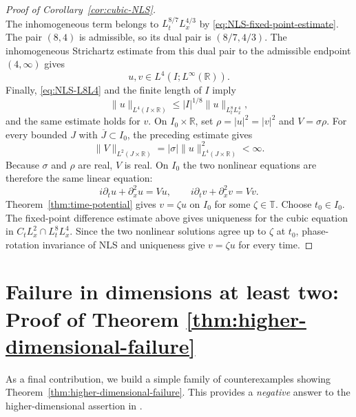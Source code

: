 \documentclass[11pt]{amsart}
\theoremstyle{remark}
\newcommand{\R}{\mathbb R}
\newcommand{\T}{\mathbb T}
\newcommand{\1}{\mathbf 1}
\begin{document}
\begin{proof}[Proof of Corollary~\ref{cor:cubic-NLS}]
\[\]
The inhomogeneous term belongs to $L^{8/7}_tL^{4/3}_x$ by
\eqref{eq:NLS-fixed-point-estimate}.  The pair $(8,4)$ is admissible, so its dual
pair is $(8/7,4/3)$.  The inhomogeneous Strichartz estimate from this dual
pair to the admissible endpoint $(4,\infty)$ gives
\[
 u,v\in L^4(I;L^\infty(\R)).
 \tag{2.4}\label{eq:NLS-endpoint}
\]
Finally, \eqref{eq:NLS-L8L4} and the finite length of $I$ imply
\[
 \|u\|_{L^4(I\times\R)}
 \le |I|^{1/8}\|u\|_{L^8_tL^4_x},
\]
and the same estimate holds for $v$. On $I_0\times\R$, set $\rho=|u|^2=|v|^2$ and
$V=\sigma\rho$.  For every bounded $J$ with $\overline{J}\subset I_0$, the preceding estimate
gives
\[
 \|V\|_{L^2(J\times\R)}
 =|\sigma|\|u\|_{L^4(J\times\R)}^2<\infty.
\]
Because $\sigma$ and $\rho$ are real, $V$ is real.  On $I_0$ the two
nonlinear equations are therefore the same linear equation:
\[
 i\partial_tu+\partial_x^2u=Vu,
 \qquad
 i\partial_tv+\partial_x^2v=Vv.
\]
Theorem~\ref{thm:time-potential} gives $v=\zeta u$ on $I_0$ for some
$\zeta\in\T$.  Choose $t_0\in I_0$.  The fixed-point difference estimate
above gives uniqueness for the cubic equation in
$C_tL^2_x\cap L^8_tL^4_x$.  Since the two nonlinear solutions agree up to
$\zeta$ at $t_0$, phase-rotation invariance of NLS and uniqueness give
$v=\zeta u$ for every time.
\end{proof}

\section{Failure in dimensions at least two: Proof of Theorem \ref{thm:higher-dimensional-failure}}

As a final contribution, we build a simple family of counterexamples showing Theorem~\ref{thm:higher-dimensional-failure}. This provides a \emph{negative} answer to the higher-dimensional assertion in \cite{Jaming2025}. 
\end{document}
